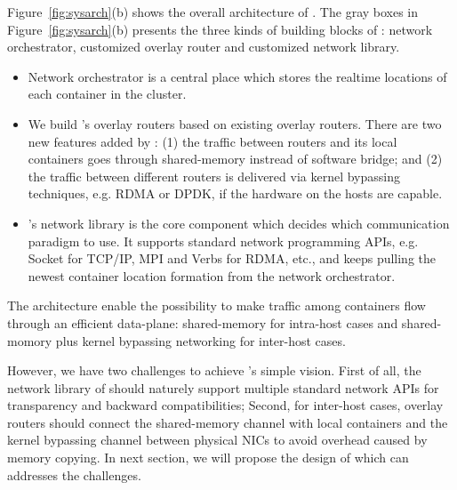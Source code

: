 Figure~\ref{fig:sysarch}(b) shows the overall architecture of \sysname.
The gray boxes in Figure~\ref{fig:sysarch}(b) presents the three kinds of
building blocks of \sysname: network orchestrator, customized overlay router and
customized network library.
\begin{itemize}

\item Network orchestrator is a central place which stores the realtime locations
of each container in the cluster. 

\item We build \sysname's overlay routers based
on existing overlay routers. There are two new features added by \sysname:
(1) the traffic between routers and its local containers goes through shared-memory instread of software bridge; and (2) the traffic between different
routers is delivered via kernel bypassing techniques, e.g. RDMA or DPDK, if
the hardware on the hosts are capable.

\item \sysname's network library is the core component which decides which
communication paradigm to use. It supports standard network programming APIs,
e.g. Socket for TCP/IP, MPI and Verbs for RDMA, etc., and keeps pulling
the newest container location formation from the network orchestrator. 


\end{itemize} 

The architecture enable the possibility to make traffic among containers flow
through an efficient data-plane: shared-memory for intra-host cases and shared-momory plus kernel bypassing networking for inter-host cases.

However, we have two challenges to achieve \sysname's simple vision.
First of all, the network library of \sysname should naturely support
multiple standard network APIs for transparency and backward compatibilities;
Second, for inter-host cases, overlay routers should connect the shared-memory
channel with local containers and the kernel bypassing channel between physical NICs to avoid overhead caused by memory copying. In next section, we will propose
the design of \sysname which can addresses the challenges.

